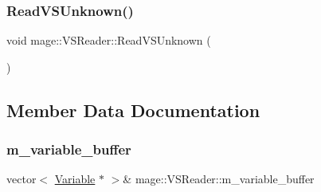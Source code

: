 \hypertarget{classmage_1_1_v_s_reader_aaa63e49901b2ef9e5903aff0e13ec4b0}{}\label{classmage_1_1_v_s_reader_aaa63e49901b2ef9e5903aff0e13ec4b0} 
\subsubsection{\texorpdfstring{Read\+V\+S\+Unknown()}{ReadVSUnknown()}}
{\footnotesize\ttfamily void mage\+::\+V\+S\+Reader\+::\+Read\+V\+S\+Unknown (\begin{DoxyParamCaption}{ }\end{DoxyParamCaption})\hspace{0.3cm}{\ttfamily [private]}}



\subsection{Member Data Documentation}
\hypertarget{classmage_1_1_v_s_reader_a32ffea034d4540dd90156452a9d78e52}{}\label{classmage_1_1_v_s_reader_a32ffea034d4540dd90156452a9d78e52} 
\subsubsection{\texorpdfstring{m\+\_\+variable\+\_\+buffer}{m\_variable\_buffer}}
{\footnotesize\ttfamily vector$<$ \hyperlink{structmage_1_1_variable}{Variable} $\ast$ $>$\& mage\+::\+V\+S\+Reader\+::m\+\_\+variable\+\_\+buffer\hspace{0.3cm}{\ttfamily [private]}}

